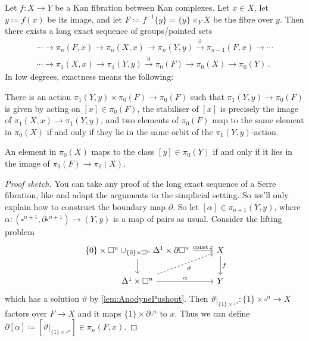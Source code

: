 \begin{lem}\label{lem:FibrationSequence}\label{lem:LongExactFibrationSequence}
	Let $f\colon X\rightarrow Y$ be a Kan fibration between Kan complexes. Let $x\in X$, let $y\coloneqq f(x)$ be its image, and let $F\coloneqq f^{-1}\{y\}=\{y\}\times_YX$ be the fibre over $y$. Then there exists a long exact sequence of groups/pointed sets
	\begin{multline*}
		\dotsb\longrightarrow\pi_n(F,x)\longrightarrow \pi_n(X,x)\longrightarrow\pi_n(Y,y)\overset{\partial}{\longrightarrow}\pi_{n-1}(F,x)\longrightarrow\dotsb\\
		\dotsb\longrightarrow\pi_1(X,x)\longrightarrow\pi_1(Y,y)\overset{\partial}{\longrightarrow}\pi_0(F)\longrightarrow\pi_0(X)\longrightarrow\pi_0(Y)\,.
	\end{multline*}
	In low degrees, exactness means the following:
	\begin{alphanumerate}
		\item \!There is an action $\pi_1(Y,y)\times\pi_0(F)\rightarrow\pi_0(F)$ such that $\pi_1(Y,y)\rightarrow \pi_0(F)$ is given by acting on $[x]\in \pi_0(F)$, the stabiliser of $[x]$ is precisely the image of $\pi_1(X,x)\rightarrow\pi_1(Y,y)$, and two elements of $\pi_0(F)$ map to the same element in $\pi_0(X)$ if and only if they lie in the same orbit of the $\pi_1(Y,y)$-action.\label{enum:ActionOfPi1}
		\item An element in $\pi_0(X)$ maps to the class $[y]\in\pi_0(Y)$ if and only if it lies in the image of $\pi_0(F)\rightarrow \pi_0(X)$.
	\end{alphanumerate}
\end{lem}
\begin{proof}[Proof sketch]
	You can take any proof of the long exact sequence of a Serre fibration, like \cite[Theorem~\href{https://pi.math.cornell.edu/~hatcher/AT/AT.pdf\#page=385}{4.41}]{Hatcher} and adapt the arguments to the simplicial setting. So we'll only explain how to construct the boundary map $\partial$. So let $[\alpha]\in\pi_{n+1}(Y,y)$, where $\alpha\colon(\square^{n+1},\partial\square^{n+1})\rightarrow(Y,y)$ is a map of pairs as usual. Consider the lifting problem
	\begin{equation*}
		\begin{tikzcd}
			\{0\}\times\square^n\cup_{\{0\}\times\square^n}\Delta^1\times\partial\square^n\rar["\const x"]\dar & X\dar["f"]\\
			\Delta^1\times\square^n\rar["\alpha"]\urar[dashed,"\vartheta"'] & Y
		\end{tikzcd}
	\end{equation*}
	which has a solution $\vartheta$ by \cref{lem:AnodynePushout}. Then $\vartheta|_{\{1\}\times\square^n}\colon \{1\}\times\square^n\rightarrow X$ factors over $F\rightarrow X$ and it maps $\{1\}\times \partial\square^n$ to $x$. Thus we can define $\partial[\alpha]\coloneqq [\vartheta|_{\{1\}\times\square^n}]\in\pi_n(F,x)$.
\end{proof}
